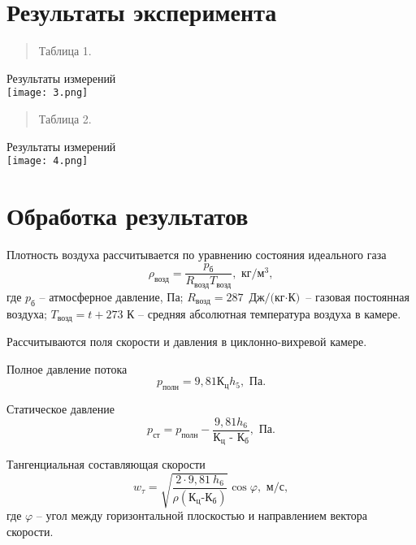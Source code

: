 \documentclass[12pt,a4paper]{article}
\begin{document}
\section{Результаты эксперимента}

\begin{quote}
\flushright Таблица 1.
\end{quote}
\begin{center}
Результаты измерений\\
\vspace{0.1cm}
\texttt{[image: 3.png]}
\end{center}

\begin{quote}
\flushright Таблица 2.
\end{quote}
\begin{center}
Результаты измерений\\
\vspace{0.1cm}
\texttt{[image: 4.png]}
\end{center}



\section{Обработка результатов}

Плотность воздуха рассчитывается по уравнению состояния идеального газа
\begin{equation}
\rho_{\text{возд}} = \dfrac{p_{\text{б}}}{R_{\text{возд}}T_{\text{возд}}}, \text{ кг/м$^3$},
\end{equation}
где $p_{\text{б}}$ – атмосферное давление, Па; $R_{\text{возд}} = 287 \text{ Дж/(кг$\cdot$К)}$ – газовая постоянная воздуха; $T_{\text{возд}} = t + 273$ К – средняя абсолютная температура
воздуха в камере.

Рассчитываются поля скорости и давления в циклонно-вихревой
камере.

Полное давление потока 
\begin{equation}
p_{\text{полн}} = 9,81\text{К$_{\text{ц}}h_5$}, \text{ Па}.
\end{equation}

Статическое давление
\begin{equation}
p_{\text{ст}}=p_{\text{полн}} - \dfrac{9,81h_6}{\text{К$_{\text{ц}}$ - К$_{\text{б}}$}}, \text{ Па}.
\end{equation}


Тангенциальная составляющая скорости
\begin{equation}
w_{\tau} = \sqrt{\dfrac{2\cdot9,81\ h_6}{\rho\left(\text{К$_{\text{ц}}$-К$_{\text{б}}$} \right)}}\cos\varphi, \text{ м/с},
\end{equation}
где $\varphi$ – угол между горизонтальной плоскостью и направлением вектора скорости.
\end{document}

